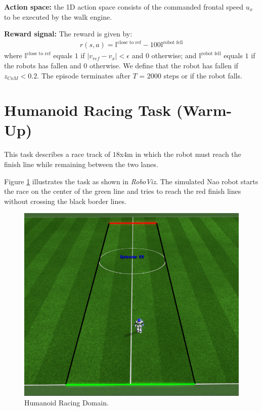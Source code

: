 \textbf{Action space:} the 1D action space consists of the commanded frontal speed $u_x$ to be executed by the
walk engine.

\textbf{Reward signal:} The reward is given by:
\begin{align*}
    r(s,a) = \mathbb{I}^{\text{close to ref}} - 100 \mathbb{I}^{\text{robot fell}}
\end{align*}
where $\mathbb{I}^{\text{close to ref}}$ equals $1$ if $\lvert v_{ref} - v_x \rvert < \epsilon$ and $0$ otherwise; and 
$\mathbb{I}^{\text{robot fell}}$ equals $1$ if the robots has fallen and $0$ otherwise.
We define that the robot has fallen if $z_{CoM} < 0.2$.
The episode terminates after $T$ = 2000 steps or if the robot falls.

\section{Humanoid Racing Task (Warm-Up)}

This task describes a race track of $18$x$4$m  in which the robot must 
reach the finish line while remaining between the two lanes.

Figure \ref{fig:racer_domain} illustrates the task as shown in \textit{RoboViz}. 
The simulated Nao robot starts the race on the center of the green line and tries to reach the red
finish lines without crossing the black border lines.

\begin{figure}[ht]
    \centering
    \includegraphics[width=1.0\textwidth]{Chapter6/racer_domain.png}
    \caption{Humanoid Racing Domain.}
    \label{fig:racer_domain}
\end{figure}

